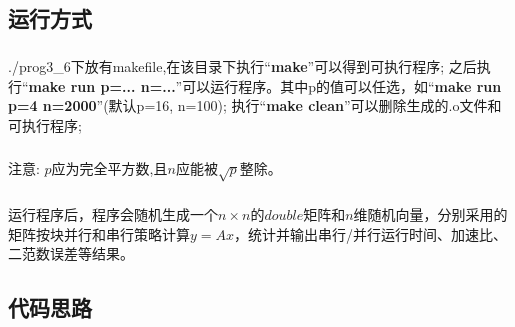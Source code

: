 \documentclass[UTF8, onecolumn, a4paper]{article}
\begin{document}
\subsection{运行方式}
\subparagraph*{}
./prog3\_6下放有makefile,在该目录下执行“\textbf{make}”可以得到可执行程序; 之后执行“\textbf{make run p=... n=...}”可以运行程序。其中p的值可以任选，如“\textbf{make run p=4 n=2000}”(默认p=16, n=100); 执行“\textbf{make clean}”可以删除生成的.o文件和可执行程序; 
\subparagraph*{}
注意: $p$应为完全平方数,且$n$应能被$\sqrt{p}$整除。
\subparagraph*{}
运行程序后，程序会随机生成一个$n\times n$的$double$矩阵和$n$维随机向量，分别采用的矩阵按块并行和串行策略计算$y = Ax$，统计并输出串行/并行运行时间、加速比、二范数误差等结果。
\subsection{代码思路}
\end{document}

